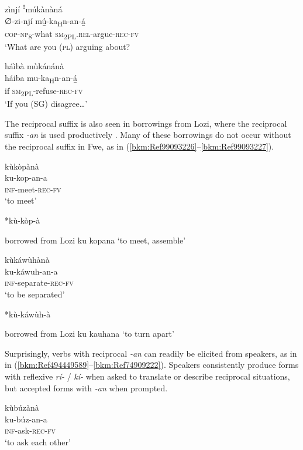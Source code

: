 \ea
\label{bkm:Ref75178625}
zìnjí ꜝmúkànàná\\
\gll ∅-zi-njí    mú̲-ka\textsubscript{H}n-an-á̲\\
\textsc{cop}-\textsc{np}\textsubscript{8}-what  \textsc{sm}\textsubscript{2PL}.\textsc{rel}-argue-\textsc{rec}-\textsc{fv}\\
\glt ‘What are you (\textsc{pl}) arguing about?
\z

\ea
\label{bkm:Ref75178635}
háìbà mùkánánà\\
\gll háiba  mu-ka\textsubscript{H}n-an-á̲\\
if  \textsc{sm}\textsubscript{2PL}-refuse-\textsc{rec}-\textsc{fv}\\
\glt ‘If you (SG) disagree…’
\z

The reciprocal suffix is also seen in borrowings from Lozi, where the reciprocal suffix \textit{-an} is used productively \citep{Fortune1977}. Many of these borrowings do not occur without the reciprocal suffix in Fwe, as in (\ref{bkm:Ref99093226}--\ref{bkm:Ref99093227}).

\ea
\label{bkm:Ref99093226}
\ea
\glll kùkòpànà\\
ku-kop-an-a\\
\textsc{inf}-meet-\textsc{rec}-\textsc{fv}\\
\glt ‘to meet’

\ex
*kù-kòp-à

\ex
borrowed from Lozi ku kopana ‘to meet, assemble’ \citep[94]{Burger1960}
\z\z

\ea
\label{bkm:Ref99093227}
\ea
\glll kùkáwùhànà\\
ku-káwuh-an-a\\
\textsc{inf}-separate-\textsc{rec}-\textsc{fv}\\
\glt ‘to be separated’

\ex
*kù-káwùh-à

\ex
borrowed from Lozi ku kauhana ‘to turn apart’ \citep[133]{Burger1960}
\z\z

Surprisingly, verbs with reciprocal \textit{-an} can readily be elicited from speakers, as in in (\ref{bkm:Ref494449589}--\ref{bkm:Ref74909222}). Speakers consistently produce forms with reflexive \textit{rí-} / \textit{kí-} when asked to translate or describe reciprocal situations, but accepted forms with \textit{-an} when prompted.

\ea
\label{bkm:Ref494449589}
\glll kùbúzànà\\
ku-búz-an-a\\
\textsc{inf}-ask-\textsc{rec}-\textsc{fv}\\
\glt ‘to ask each other’
\z

